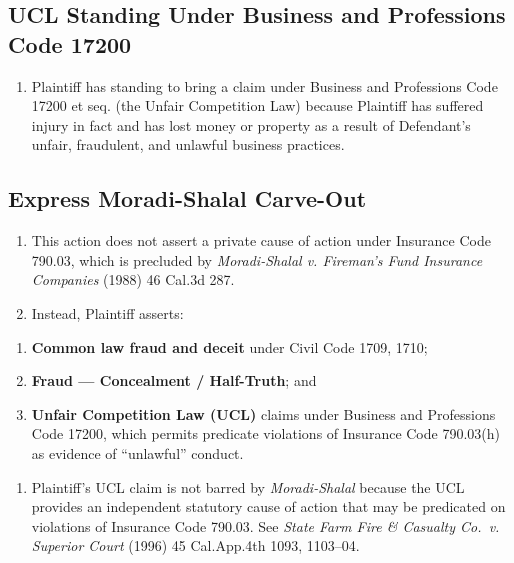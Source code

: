 \subsection{UCL Standing Under Business and Professions Code \textsection{} 17200}\label{ucl-standing-under-business-and-professions-code-17200}

\begin{enumerate}
\def\labelenumi{\arabic{enumi}.}
\setcounter{enumi}{9}
\tightlist
\item
  Plaintiff has standing to bring a claim under Business and Professions Code \textsection{} 17200 et seq. (the Unfair Competition Law) because Plaintiff has suffered injury in fact and has lost money or property as a result of Defendant's unfair, fraudulent, and unlawful business practices.
\end{enumerate}

\subsection{Express Moradi-Shalal Carve-Out}\label{express-moradi-shalal-carve-out}

\begin{enumerate}
\def\labelenumi{\arabic{enumi}.}
\setcounter{enumi}{10}
\item
  This action does not assert a private cause of action under Insurance Code \textsection{} 790.03, which is precluded by \emph{Moradi-Shalal v. Fireman's Fund Insurance Companies} (1988) 46 Cal.3d 287.
\item
  Instead, Plaintiff asserts:
\end{enumerate}

\begin{enumerate}
\def\labelenumi{(\alph{enumi})}
\item
  \textbf{Common law fraud and deceit} under Civil Code \textsection{}\textsection{} 1709, 1710;
\item
  \textbf{Fraud --- Concealment / Half-Truth}; and
\item
  \textbf{Unfair Competition Law (UCL)} claims under Business and Professions Code \textsection{} 17200, which permits predicate violations of Insurance Code \textsection{} 790.03(h) as evidence of ``unlawful'' conduct.
\end{enumerate}

\begin{enumerate}
\def\labelenumi{\arabic{enumi}.}
\setcounter{enumi}{12}
\tightlist
\item
  Plaintiff's UCL claim is not barred by \emph{Moradi-Shalal} because the UCL provides an independent statutory cause of action that may be predicated on violations of Insurance Code \textsection{} 790.03. See \emph{State Farm Fire \& Casualty Co.~v. Superior Court} (1996) 45 Cal.App.4th 1093, 1103--04.
\end{enumerate}

